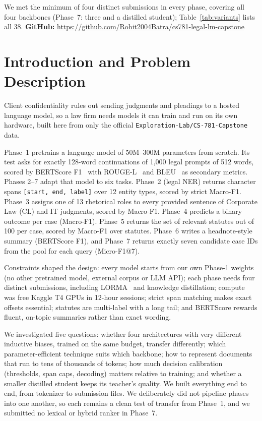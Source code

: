 \documentclass[11pt, oneside]{article}
\begin{document}
We met the minimum of four distinct submissions in every phase, covering all four backbones (Phase~7: three and a distilled student); Table~\ref{tab:variants} lists all 38.
\textbf{GitHub:} \url{https://github.com/Rohit2004Batra/cs781-legal-lm-capstone}

\section{Introduction and Problem Description}
Client confidentiality rules out sending judgments and pleadings to a hosted language model, so a law firm needs models it can train and run on its own hardware, built here from only the official \texttt{Exploration-Lab/CS-781-Capstone} data.

Phase~1 pretrains a language model of 50M--300M parameters from scratch. Its test asks for exactly 128-word continuations of 1,000 legal prompts of 512 words, scored by BERTScore F1~\cite{zhang2020bertscore} with ROUGE-L~\cite{lin2004rouge} and BLEU~\cite{papineni2002bleu} as secondary metrics. Phases 2--7 adapt that model to six tasks. Phase~2 (legal NER) returns character spans \texttt{[start, end, label]} over 12 entity types, scored by strict Macro-F1. Phase~3 assigns one of 13 rhetorical roles to every provided sentence of Corporate Law (CL) and IT judgments, scored by Macro-F1. Phase~4 predicts a binary outcome per case (Macro-F1). Phase~5 returns the set of relevant statutes out of 100 per case, scored by Macro-F1 over statutes. Phase~6 writes a headnote-style summary (BERTScore F1), and Phase~7 returns exactly seven candidate case IDs from the pool for each query (Micro-F1@7).

Constraints shaped the design: every model starts from our own Phase-1 weights (no other pretrained model, external corpus or LLM API); each phase needs four distinct submissions, including LORMA~\cite{bihany2025lorma} and knowledge distillation; compute was free Kaggle T4 GPUs in 12-hour sessions; strict span matching makes exact offsets essential; statutes are multi-label with a long tail; and BERTScore rewards fluent, on-topic summaries rather than exact wording.

We investigated five questions: whether four architectures with very different inductive biases, trained on the same budget, transfer differently; which parameter-efficient technique suits which backbone; how to represent documents that run to tens of thousands of tokens; how much decision calibration (thresholds, span caps, decoding) matters relative to training; and whether a smaller distilled student keeps its teacher's quality. We built everything end to end, from tokenizer to submission files. We deliberately did not pipeline phases into one another, so each remains a clean test of transfer from Phase~1, and we submitted no lexical or hybrid ranker in Phase~7.
\end{document}
